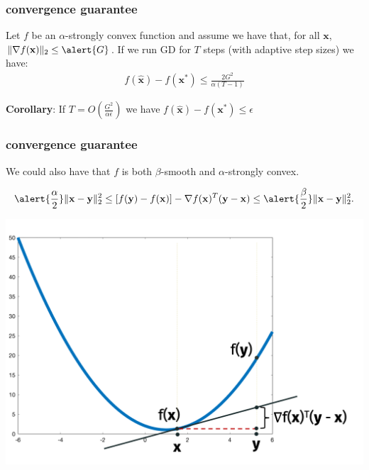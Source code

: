 \documentclass[compress]{beamer}
\newcommand{\bv}[1]{\mathbf{#1}}
\begin{document}
\begin{frame}[t]
	\frametitle{convergence guarantee}
	\begin{theorem}
		Let $f$ be an \alert{$\alpha$}-strongly convex function and assume we have that, for all $\bv{x}$, $\|\nabla f(\bv{x})\|_2 \leq \alert{G}$. If we run GD for $T$ steps (with adaptive step sizes) we have:
		\begin{align*}
			f(\hat{\bv{x}}) - f(\bv{x}^*) \leq \frac{2G^2}{\alpha(T-1)} 
		\end{align*} 
	\end{theorem}
	\textbf{Corollary}: If \alert{$T = O\left(\frac{G^2}{\alpha \epsilon}\right)$} we have $f(\hat{\bv{x}}) - f(\bv{x}^*) \leq \epsilon$
\end{frame}

\begin{frame}[t]
	\frametitle{convergence guarantee}
	\begin{center}
		We could also have that $f$ is both $\beta$-smooth and $\alpha$-strongly convex.
	\end{center}
	\begin{align*}
		\alert{\frac{\alpha}{2}}\|\bv{x} - \bv{y}\|_2^2 \leq \left[f(\bv{y}) - f(\bv{x})\right] - \nabla f(\bv{x})^T(\bv{y} - \bv{x}) \leq \alert{\frac{\beta}{2}}\|\bv{x} - \bv{y}\|_2^2.
	\end{align*}
	\vspace{-2em}
	\begin{center}
		\includegraphics[width=.6\textwidth]{smoothness_image.png}
	\end{center}	
	
\end{frame}
\end{document}
